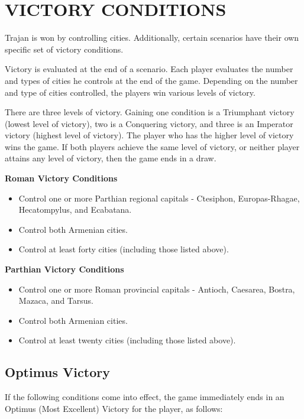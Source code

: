 \section{VICTORY CONDITIONS}

Trajan is won by controlling cities. Additionally, certain scenarios have their own specific set of victory conditions.

Victory is evaluated at the end of a scenario. Each player evaluates the number and types of cities he controls at the end of the game. Depending on the number and type of cities controlled, the players win various levels of victory.

There are three levels of victory. Gaining one condition is a Triumphant victory (lowest level of victory), two is a Conquering victory, and three is an Imperator victory (highest level of victory). The player who has the higher level of victory wins the game. If both players achieve the same level of victory, or neither player attains any level of victory, then the game ends in a draw.

\textbf{Roman Victory Conditions}

\begin{itemize}
  \item Control one or more Parthian regional capitals - Ctesiphon, Europas-Rhagae, Hecatompylus, and Ecabatana.
  \item Control both Armenian cities.
  \item Control at least forty cities (including those listed above).
\end{itemize}

\textbf{Parthian Victory Conditions}

\begin{itemize}
  \item Control one or more Roman provincial capitals - Antioch, Caesarea, Bostra, Mazaca, and Tarsus.
  \item Control both Armenian cities.
  \item Control at least twenty cities (including those listed above).
\end{itemize}

\subsection{Optimus Victory}

If the following conditions come into effect, the game immediately ends in an Optimus (Most Excellent) Victory for the player, as follows:

